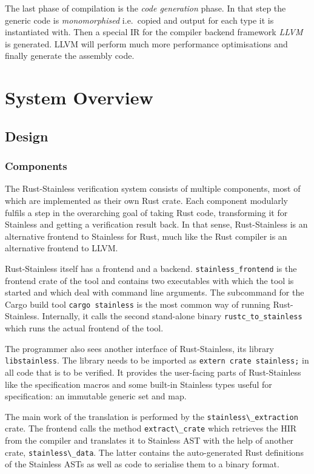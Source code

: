 The last phase of compilation is the \emph{code generation} phase. In
that step the generic code is \emph{monomorphised} i.e.~copied and
output for each type it is instantiated with. Then a special IR for the
compiler backend framework \emph{LLVM} \cite{llvm} is generated. LLVM
will perform much more performance optimisations and finally generate
the assembly code.

\section{System Overview}

\subsection{Design}

\subsubsection{Components}

The Rust-Stainless verification system consists of multiple components,
most of which are implemented as their own Rust crate. Each component
modularly fulfils a step in the overarching goal of taking Rust code,
transforming it for Stainless and getting a verification result back. In
that sense, Rust-Stainless is an alternative frontend to Stainless for
Rust, much like the Rust compiler is an alternative frontend to LLVM.

Rust-Stainless itself has a frontend and a backend.
\lstinline!stainless_frontend! is the frontend crate of the tool and contains
two executables with which the tool is started and which deal with command line
arguments. The subcommand for the Cargo build tool \passthrough{\lstinline!cargo
stainless!} is the most common way of running Rust-Stainless. Internally, it
calls the second stand-alone binary \lstinline!rustc_to_stainless! which runs
the actual frontend of the tool.

The programmer also sees another interface of Rust-Stainless, its
library \lstinline!libstainless!. The library needs to be
imported as \passthrough{\lstinline!extern crate stainless;!} in all
code that is to be verified. It provides the user-facing parts of
Rust-Stainless like the specification macros and some built-in Stainless
types useful for specification: an immutable generic set and map.

The main work of the translation is performed by the
\passthrough{\lstinline!stainless\_extraction!} crate. The frontend
calls the method \passthrough{\lstinline!extract\_crate!} which
retrieves the HIR from the compiler and translates it to Stainless AST
with the help of another crate,
\passthrough{\lstinline!stainless\_data!}. The latter contains the
auto-generated Rust definitions of the Stainless ASTs as well as code to
serialise them to a binary format.

